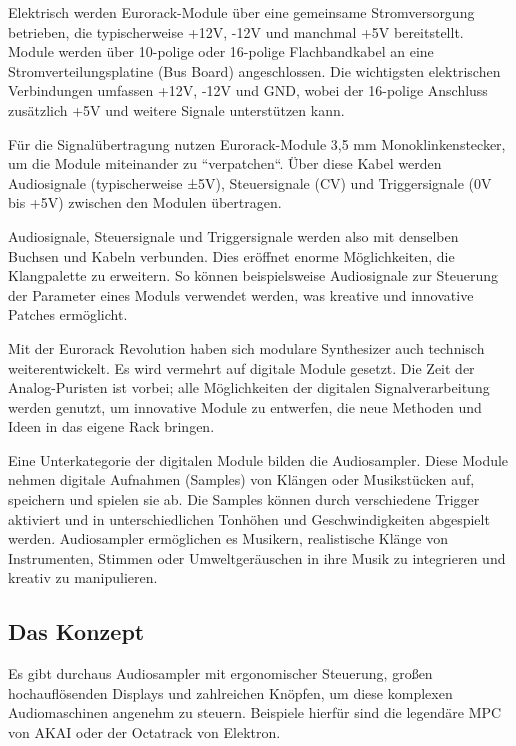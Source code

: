 	Elektrisch werden Eurorack-Module über eine gemeinsame Stromversorgung betrieben, die typischerweise +12V, -12V und manchmal +5V bereitstellt. Module werden über 10-polige oder 16-polige Flachbandkabel an eine Stromverteilungsplatine (Bus Board) angeschlossen. Die wichtigsten elektrischen Verbindungen umfassen +12V, -12V und GND, wobei der 16-polige Anschluss zusätzlich +5V und weitere Signale unterstützen kann.
	
	Für die Signalübertragung nutzen Eurorack-Module 3,5 mm Monoklinkenstecker, um die Module miteinander zu ``verpatchen``. Über diese Kabel werden Audiosignale (typischerweise ±5V), Steuersignale (CV) und Triggersignale (0V bis +5V) zwischen den Modulen übertragen.
	
	Audiosignale, Steuersignale und Triggersignale werden also mit denselben Buchsen und Kabeln verbunden.
	Dies eröffnet enorme Möglichkeiten, die Klangpalette zu erweitern. So können beispielsweise Audiosignale zur Steuerung der Parameter eines Moduls verwendet werden, was kreative und innovative Patches ermöglicht.
	
	Mit der Eurorack Revolution haben sich modulare Synthesizer auch technisch weiterentwickelt. 
	Es wird vermehrt auf digitale Module gesetzt. 
	Die Zeit der Analog-Puristen ist vorbei; alle Möglichkeiten der digitalen Signalverarbeitung werden genutzt, um innovative Module zu entwerfen, die neue Methoden und Ideen in das eigene Rack bringen.
	
	Eine Unterkategorie der digitalen Module bilden die Audiosampler. Diese Module nehmen digitale Aufnahmen (Samples) von Klängen oder Musikstücken auf, speichern und spielen sie ab. Die Samples können durch verschiedene Trigger aktiviert und in unterschiedlichen Tonhöhen und Geschwindigkeiten abgespielt werden. 
	Audiosampler ermöglichen es Musikern, realistische Klänge von Instrumenten, Stimmen oder Umweltgeräuschen in ihre Musik zu integrieren und kreativ zu manipulieren.
	
	
	
	\newpage
	\subsection{Das Konzept}
	
	Es gibt durchaus Audiosampler mit ergonomischer Steuerung, großen hochauflösenden Displays und zahlreichen Knöpfen, um diese komplexen Audiomaschinen angenehm zu steuern. 
	Beispiele hierfür sind die legendäre MPC von AKAI oder der Octatrack von Elektron. 
	
